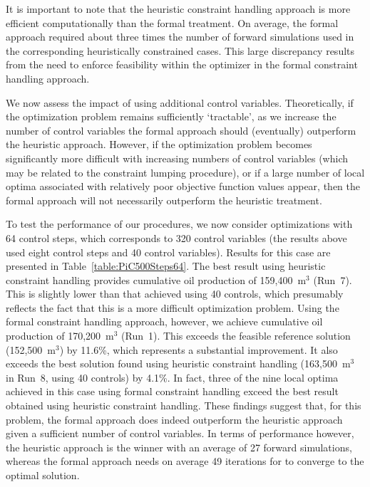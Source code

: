 \documentclass[twocolumn,numbook]{svjour3}          %
\begin{document}
It is important to note that the heuristic constraint handling approach is
more efficient computationally than the formal treatment. On average,
the formal approach required about three times the number of forward
simulations used in the corresponding heuristically constrained cases. This
large discrepancy results from the need to enforce feasibility within the
optimizer in the formal constraint handling approach.

We now assess the impact of using additional control variables. Theoretically, if the optimization problem remains sufficiently `tractable', as we increase the number of control variables the formal approach should (eventually) outperform the heuristic approach. However, if the optimization problem becomes significantly more difficult with increasing numbers of control variables (which may be related to the constraint lumping procedure), or if a large number of local optima associated with relatively poor objective function values appear, then the formal approach will not necessarily outperform the heuristic treatment. 

To test the performance of our procedures, we now consider optimizations with 64 control steps, which corresponds to 320 control variables (the results above used eight control steps and 40 control variables). Results for this case are presented in Table~\ref{table:PiC500Steps64}. The best result using heuristic constraint handling provides cumulative oil production of 159,400~m$^3$ (Run~7). This is slightly lower than that achieved using 40 controls, which presumably reflects the fact that this is a more difficult optimization problem. Using the formal constraint handling approach, however, we achieve cumulative oil production of 170,200~m$^3$ (Run~1). This exceeds the feasible reference solution (152,500~m$^3$) by 11.6\%, which represents a substantial improvement. It also exceeds the best solution found using heuristic constraint handling (163,500~m$^3$ in Run~8, using 40 controls) by 4.1\%. In fact, three of the nine local optima achieved in this case using formal constraint handling exceed the best result obtained using heuristic constraint handling. These findings suggest that, for this problem, the formal approach does indeed outperform the heuristic approach given a sufficient number of control variables.
In terms of performance however, the heuristic approach is the winner with an average of 27 forward simulations, whereas the formal approach needs on average 49 iterations for to converge to the optimal solution.
\end{document}
